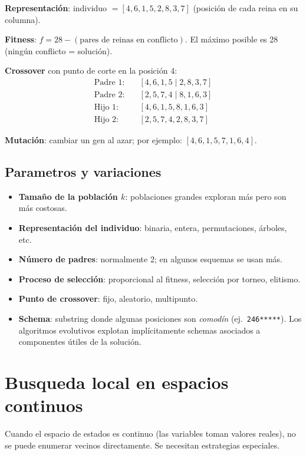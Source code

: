 \begin{example}
    \textbf{Representación}: individuo $= [4,6,1,5,2,8,3,7]$ (posición
    de cada reina en su columna).
    
    \textbf{Fitness}: $f = 28 - (\text{pares de reinas en conflicto})$.
    El máximo posible es 28 (ningún conflicto = solución).
   
    \medskip
    \textbf{Crossover} con punto de corte en la posición 4:
    \begin{align*}
      \text{Padre 1:} &\quad [4,6,1,5 \mid 2,8,3,7] \\
      \text{Padre 2:} &\quad [2,5,7,4 \mid 8,1,6,3] \\[4pt]
      \text{Hijo 1:}  &\quad [4,6,1,5,8,1,6,3] \\
      \text{Hijo 2:}  &\quad [2,5,7,4,2,8,3,7]
    \end{align*}
   
    \textbf{Mutación}: cambiar un gen al azar; por ejemplo:
    $[4,6,1,5,7,1,6,4]$.
\end{example}


\subsection{Parametros y variaciones}
\begin{itemize}
    \item \textbf{Tamaño de la población $k$}: poblaciones grandes
        exploran más pero son más costosas.
    \item \textbf{Representación del individuo}: binaria, entera,
        permutaciones, árboles, etc.
    \item \textbf{Número de padres}: normalmente 2; en algunos esquemas
        se usan más.
    \item \textbf{Proceso de selección}: proporcional al fitness,
        selección por torneo, elitismo.
    \item \textbf{Punto de crossover}: fijo, aleatorio, multipunto.
    \item \textbf{Schema}: substring donde algunas posiciones son
        \emph{comodín} (ej.\ \texttt{246*****}). Los algoritmos
        evolutivos explotan implícitamente schemas asociados a
        componentes útiles de la solución.
\end{itemize}

\section{Busqueda local en espacios continuos}
Cuando el espacio de estados es continuo (las variables toman valores reales), no se puede enumerar vecinos directamente. Se necesitan estrategias especiales.
